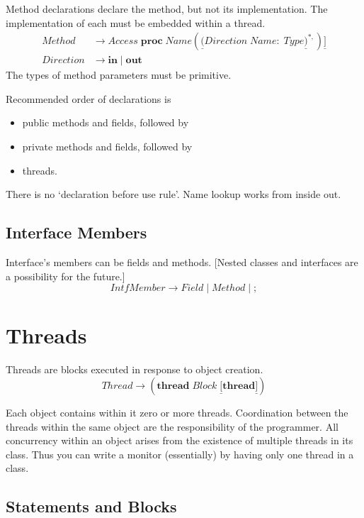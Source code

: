 \documentclass{article}%
\begin{document}
Method declarations declare the method, but not its implementation. The
implementation of each must be embedded within a thread.%
\begin{align*}
Method  &  \rightarrow Access\;\mathbf{proc}\;Name(\underline{(}%
Direction\;Name:\;Type\underline{)}^{\ast,})\underline{]}\\
Direction  &  \rightarrow\mathbf{in}\mid\mathbf{out}%
\end{align*}
The types of method parameters must be primitive.

Recommended order of declarations is

\begin{itemize}
\item public methods and fields, followed by

\item private methods and fields, followed by

\item threads.
\end{itemize}

There is no `declaration before use rule'. Name lookup works from inside out.

\subsection{Interface Members}

Interface's members can be fields and methods. [Nested classes and interfaces
are a possibility for the future.]%
\[
IntfMember\rightarrow Field\mid Method\mid{};
\]


\section{Threads}

Threads are blocks executed in response to object creation.
\[
Thread\rightarrow(\mathbf{thread}\;Block\;\underline{[}\mathbf{thread}%
\underline{]})
\]


Each object contains within it zero or more threads. Coordination between the
threads within the same object are the responsibility of the programmer. All
concurrency within an object arises from the existence of multiple threads in
its class. Thus you can write a monitor (essentially) by having only one
thread in a class.

\subsection{Statements and Blocks}
\end{document}
